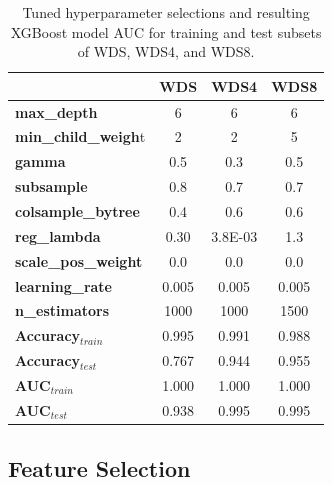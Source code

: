 \begin{table}[!htp]
    \centering
    \begin{tabular}{l|c|c|c|}
    \cline{2-4}
                                             & \textbf{WDS}   & \textbf{WDS4}    & \textbf{WDS8}  \\ \hline
    \multicolumn{1}{|l|}{\textbf{max\_depth}}         & 6     & 6       & 6     \\ \hline
    \multicolumn{1}{|l|}{\textbf{min\_child\_weigh}t} & 2     & 2       & 5     \\ \hline
    \multicolumn{1}{|l|}{\textbf{gamma}}              & 0.5   & 0.3     & 0.5   \\ \hline
    \multicolumn{1}{|l|}{\textbf{subsample}}          & 0.8   & 0.7     & 0.7   \\ \hline
    \multicolumn{1}{|l|}{\textbf{colsample\_bytree}}  & 0.4   & 0.6     & 0.6   \\ \hline
    \multicolumn{1}{|l|}{\textbf{reg\_lambda}}        & 0.30  & 3.8E-03 & 1.3   \\ \hline
    \multicolumn{1}{|l|}{\textbf{scale\_pos\_weight}} & 0.0   & 0.0     & 0.0   \\ \hline
    \multicolumn{1}{|l|}{\textbf{learning\_rate}}     & 0.005 & 0.005   & 0.005 \\ \hline
    \multicolumn{1}{|l|}{\textbf{n\_estimators}}      & 1000  & 1000    & 1500  \\ \hline
    \multicolumn{1}{|l|}{\textbf{Accuracy$_{train}$}} & 0.995 & 0.991   & 0.988 \\ \hline
    \multicolumn{1}{|l|}{\textbf{Accuracy$_{test}$}}  & 0.767 & 0.944   & 0.955 \\ \hline
    \multicolumn{1}{|l|}{\textbf{AUC$_{train}$}}      & 1.000 & 1.000   & 1.000 \\ \hline
    \multicolumn{1}{|l|}{\textbf{AUC$_{test}$}}       & 0.938 & 0.995   & 0.995 \\ \hline
    \end{tabular}
    \caption[XGBoost hyperparameter values]{Tuned hyperparameter selections and resulting XGBoost model AUC for training and test subsets of WDS, WDS4, and WDS8.}
    \label{tab:xgb_tuning}
\end{table}

\subsection{Feature Selection}\label{ch5:xgb_feature_selection}

